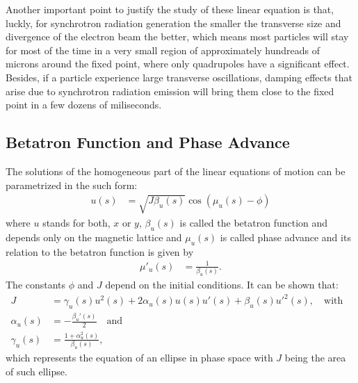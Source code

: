 \documentclass[
	12pt,				%
	openright,			%
	oneside,			%
	a4paper,		%
	chapter=TITLE,		%
	section=TITLE,		%
    brazil,				%
	english,			%
	sumario=tradicional,
	]{abntex2}
\begin{document}
	Another important point to justify the study of these linear equation is that, luckly, for synchrotron radiation generation the smaller the transverse size and divergence of the electron beam the better, which means most particles will stay for most of the time in a very small region of approximately hundreads of microns around the fixed point, where only quadrupoles have a significant effect. Besides, if a particle experience large transverse oscillations, damping effects that arise due to synchrotron radiation emission will bring them close to the fixed point in a few dozens of miliseconds.


    \subsection{Betatron Function and Phase Advance} \label{ssub:betatron_function}

	The solutions of the homogeneous part of the linear equations of motion can be parametrized in the such form:
	\begin{align} \label{eq:betatron_motion}
		u(s) &= \sqrt{J\beta_u(s)} \cos(\mu_u(s) - \phi)
	\end{align}
	where $u$ stands for both, $x$ or $y$, $\beta_u(s)$ is called the betatron function and depends only on the magnetic lattice and $\mu_u(s)$ is called phase advance and its relation to the betatron function is given by
	\begin{align}
		\mu'_u(s) &= \frac{1}{\beta_u(s)}.
	\end{align}
	The constants $\phi$ and $J$ depend on the initial conditions. It can be shown that:
	\begin{align} \label{eq:linear_invariant}
		J &= \gamma_u(s)u^2(s) + 2\alpha_u(s)u(s)u'(s) + \beta_u(s)u'^2(s),
												\quad \text{with}& \\
        \alpha_u(s) &= -\frac{\beta_u'(s)}{2} \quad \text{and}& \nonumber \\ \nonumber
		\gamma_u(s) &= \frac{1+\alpha_u^2(s)}{\beta_u(s)},&
	\end{align}
	which represents the equation of an ellipse in phase space with $J$ being the area of such ellipse.
\end{document}
